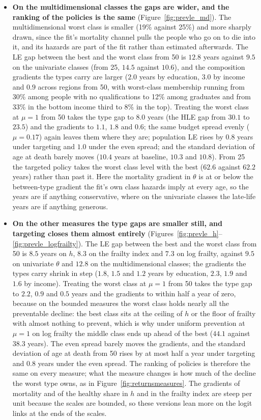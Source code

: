 \documentclass[11pt]{article}
\begin{document}
	\begin{itemize}
		\item \textbf{On the multidimensional classes the gaps are wider, and the ranking of the policies is the same} (Figure~\ref{fig:prevle_md}). The multidimensional worst class is smaller (19\% against 25\%) and more sharply drawn, since the fit's mortality channel pulls the people who go on to die into it, and its hazards are part of the fit rather than estimated afterwards. The LE gap between the best and the worst class from 50 is $12.8$ years against $9.5$ on the univariate classes (from 25, $14.5$ against $10.6$), and the composition gradients the types carry are larger ($2.0$ years by education, $3.0$ by income and $0.9$ across regions from 50, with worst-class membership running from 30\% among people with no qualifications to 12\% among graduates and from 33\% in the bottom income third to 8\% in the top). Treating the worst class at $\mu=1$ from 50 takes the type gap to $8.0$ years (the HLE gap from $30.1$ to $23.5$) and the gradients to $1.1$, $1.8$ and $0.6$; the same budget spread evenly ($\mu=0.17$) again leaves them where they are; population LE rises by $0.8$ years under targeting and $1.0$ under the even spread; and the standard deviation of age at death barely moves ($10.4$ years at baseline, $10.3$ and $10.8$). From 25 the targeted policy takes the worst class level with the best ($62.6$ against $62.2$ years) rather than past it. Here the mortality gradient in $\theta$ is at or below the between-type gradient the fit's own class hazards imply at every age, so the years are if anything conservative, where on the univariate classes the late-life years are if anything generous.
		\item \textbf{On the other measures the type gaps are smaller still, and targeting closes them almost entirely} (Figures~\ref{fig:prevle_h}--\ref{fig:prevle_logfrailty}). The LE gap between the best and the worst class from 50 is $8.5$ years on $h$, $8.3$ on the frailty index and $7.3$ on log frailty, against $9.5$ on univariate $\theta$ and $12.8$ on the multidimensional classes; the gradients the types carry shrink in step ($1.8$, $1.5$ and $1.2$ years by education, $2.3$, $1.9$ and $1.6$ by income). Treating the worst class at $\mu=1$ from 50 takes the type gap to $2.2$, $0.9$ and $0.5$ years and the gradients to within half a year of zero, because on the bounded measures the worst class holds nearly all the preventable decline: the best class sits at the ceiling of $h$ or the floor of frailty with almost nothing to prevent, which is why under uniform prevention at $\mu=1$ on log frailty the middle class ends up ahead of the best ($44.1$ against $38.3$ years). The even spread barely moves the gradients, and the standard deviation of age at death from 50 rises by at most half a year under targeting and $0.8$ years under the even spread. The ranking of policies is therefore the same on every measure; what the measure changes is how much of the decline the worst type owns, as in Figure~\ref{fig:returnsmeasures}. The gradients of mortality and of the healthy share in $h$ and in the frailty index are steep per unit because the scales are bounded, so these versions lean more on the logit links at the ends of the scales.
	\end{itemize}
\end{document}

